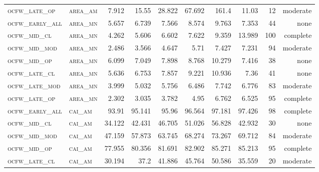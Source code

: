 \begin{landscape}
\begin{center}
\begin{footnotesize}
\begin{longtable}{llrrrrr|rrr}
\textsc{ocfw\_late\_op  } & \textsc{area\_am  }    & 7.912    & 15.55    & 28.822   & 67.692   & 161.4      & 11.03         & 12            & moderate        \\
\textsc{ocfw\_early\_all} & \textsc{area\_mn  }    & 5.657    & 6.739    & 7.566    & 8.574    & 9.763      & 7.353         & 44            & none        \\
\textsc{ocfw\_mid\_cl   } & \textsc{area\_mn  }    & 4.262    & 5.606    & 6.602    & 7.622    & 9.359      & 13.989        & 100           & complete             \\
\textsc{ocfw\_mid\_mod  } & \textsc{area\_mn  }    & 2.486    & 3.566    & 4.647    & 5.71     & 7.427      & 7.231         & 94            & moderate        \\
\textsc{ocfw\_mid\_op   } & \textsc{area\_mn  }    & 6.099    & 7.049    & 7.898    & 8.768    & 10.279     & 7.416         & 38            & none        \\
\textsc{ocfw\_late\_cl  } & \textsc{area\_mn  }    & 5.636    & 6.753    & 7.857    & 9.221    & 10.936     & 7.36          & 41            & none        \\
\textsc{ocfw\_late\_mod } & \textsc{area\_mn  }    & 3.999    & 5.032    & 5.756    & 6.486    & 7.742      & 6.776         & 83            & moderate        \\
\textsc{ocfw\_late\_op  } & \textsc{area\_mn  }    & 2.302    & 3.035    & 3.782    & 4.95     & 6.762      & 6.525         & 95            & complete        \\
\textsc{ocfw\_early\_all} & \textsc{cai\_am   }    & 93.91    & 95.141   & 95.96    & 96.564   & 97.181     & 97.426        & 98            & complete        \\
\textsc{ocfw\_mid\_cl   } & \textsc{cai\_am   }    & 34.122   & 42.431   & 46.705   & 51.026   & 56.828     & 42.932        & 30            & none        \\
\textsc{ocfw\_mid\_mod  } & \textsc{cai\_am   }    & 47.159   & 57.873   & 63.745   & 68.274   & 73.267     & 69.712        & 84            & moderate        \\
\textsc{ocfw\_mid\_op   } & \textsc{cai\_am   }    & 77.955   & 80.356   & 81.691   & 82.902   & 85.271     & 85.213        & 95            & complete        \\
\textsc{ocfw\_late\_cl  } & \textsc{cai\_am   }    & 30.194   & 37.2     & 41.886   & 45.764   & 50.586     & 35.559        & 20            & moderate        \\

\end{longtable}
\end{footnotesize}
\end{center}
\end{landscape}
